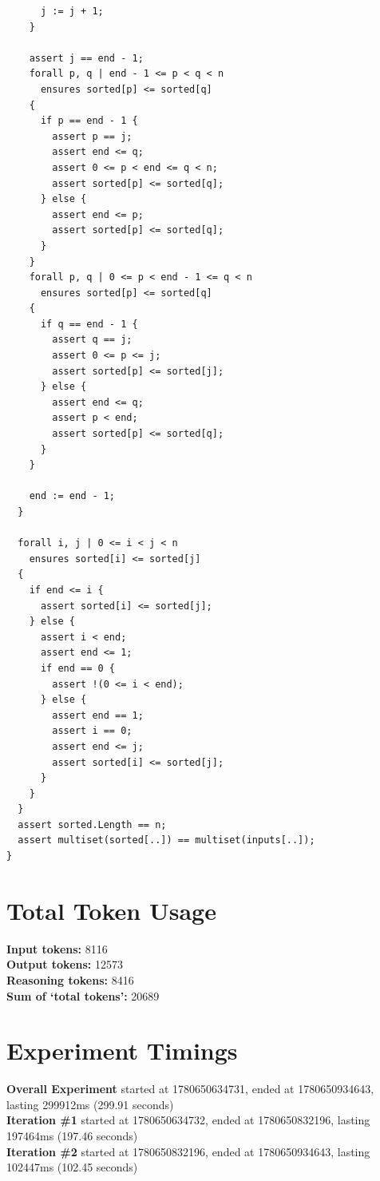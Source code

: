 \documentclass{article}
\begin{document}
\begin{lstlisting}
      j := j + 1;
    }

    assert j == end - 1;
    forall p, q | end - 1 <= p < q < n
      ensures sorted[p] <= sorted[q]
    {
      if p == end - 1 {
        assert p == j;
        assert end <= q;
        assert 0 <= p < end <= q < n;
        assert sorted[p] <= sorted[q];
      } else {
        assert end <= p;
        assert sorted[p] <= sorted[q];
      }
    }
    forall p, q | 0 <= p < end - 1 <= q < n
      ensures sorted[p] <= sorted[q]
    {
      if q == end - 1 {
        assert q == j;
        assert 0 <= p <= j;
        assert sorted[p] <= sorted[j];
      } else {
        assert end <= q;
        assert p < end;
        assert sorted[p] <= sorted[q];
      }
    }

    end := end - 1;
  }

  forall i, j | 0 <= i < j < n
    ensures sorted[i] <= sorted[j]
  {
    if end <= i {
      assert sorted[i] <= sorted[j];
    } else {
      assert i < end;
      assert end <= 1;
      if end == 0 {
        assert !(0 <= i < end);
      } else {
        assert end == 1;
        assert i == 0;
        assert end <= j;
        assert sorted[i] <= sorted[j];
      }
    }
  }
  assert sorted.Length == n;
  assert multiset(sorted[..]) == multiset(inputs[..]);
}
\end{lstlisting}
\section*{Total Token Usage}
\textbf{Input tokens: }8116
\\\textbf{Output tokens: }12573
\\\textbf{Reasoning tokens: }8416
\\\textbf{Sum of `total tokens': }20689
\section*{Experiment Timings}
\textbf{Overall Experiment} started at 1780650634731, ended at 1780650934643, lasting 299912ms (299.91 seconds)
\\\textbf{Iteration \#1} started at 1780650634732, ended at 1780650832196, lasting 197464ms (197.46 seconds)
\\\textbf{Iteration \#2} started at 1780650832196, ended at 1780650934643, lasting 102447ms (102.45 seconds)
\end{document}
